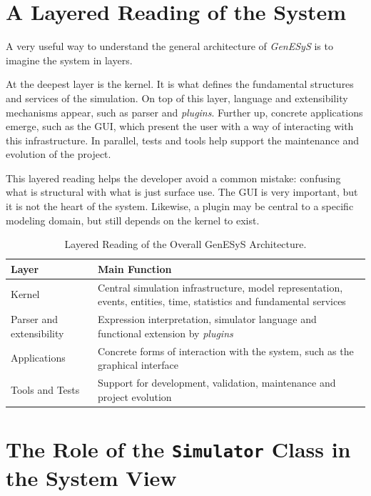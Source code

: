 \section{A Layered Reading of the System}
\label{sec:cap6_leitura_em_camadas}

A very useful way to understand the general architecture of \textit{GenESyS} is to imagine the system in layers.

At the deepest layer is the kernel. It is what defines the fundamental structures and services of the simulation. On top of this layer, language and extensibility mechanisms appear, such as parser and \textit{plugins}. Further up, concrete applications emerge, such as the GUI, which present the user with a way of interacting with this infrastructure. In parallel, tests and tools help support the maintenance and evolution of the project.

This layered reading helps the developer avoid a common mistake: confusing what is structural with what is just surface use. The GUI is very important, but it is not the heart of the system. Likewise, a plugin may be central to a specific modeling domain, but still depends on the kernel to exist.

\begin{table}[htbp]
 \centering
 \caption{Layered Reading of the Overall GenESyS Architecture.}
 \label{tab:cap6_leitura_em_camadas}
 \small
 \begin{tabular}{|p{3.3cm}|p{7.8cm}|}
 \hline
 \textbf{Layer} & \textbf{Main Function} \\
 \hline
 Kernel & Central simulation infrastructure, model representation, events, entities, time, statistics and fundamental services \\
 \hline
 Parser and extensibility & Expression interpretation, simulator language and functional extension by \textit{plugins} \\
 \hline
 Applications & Concrete forms of interaction with the system, such as the graphical interface \\
 \hline
 Tools and Tests & Support for development, validation, maintenance and project evolution \\
 \hline
 \end{tabular}
\end{table}

\section{The Role of the \texttt{Simulator} Class in the System View}
\label{sec:cap6_papel_classe_simulator}


